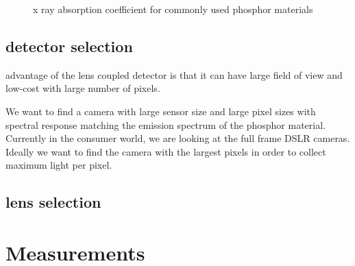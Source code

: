 \begin{figure}
\centering
{}
\caption{x ray absorption coefficient for commonly used phosphor materials}
\label{fig:absorptioncoeff}
\end{figure}


\subsection{detector selection}
advantage of the lens coupled detector is that it can have large field of view and low-cost with large number of pixels.

We want to find a camera with large sensor size and large pixel sizes with spectral response matching the emission spectrum of the phosphor material.  Currently in the consumer world, we are looking at the full frame DSLR cameras.  Ideally we want to find the camera with the largest pixels in order to collect maximum light per pixel.







\subsection{lens selection}

\section{Measurements}

